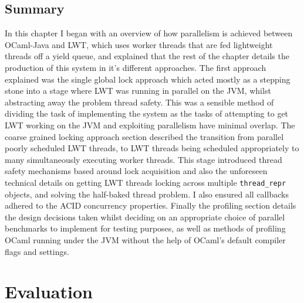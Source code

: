\documentclass[12pt,twoside,notitlepage]{report}
\begin{document}
\section{Summary}
\label{sec:implementation_summary}
In this chapter I began with an overview of how parallelism is achieved between OCaml-Java and LWT, which uses worker threads that are fed lightweight threads off a yield queue, and explained that the rest of the chapter details the
production of this system in it's different approaches. The first approach explained was the single global lock approach which acted mostly as a stepping stone into a stage where LWT was running in parallel on the JVM, whilst abstracting
away the problem thread safety. This was a sensible method of dividing the task of implementing the system as the tasks of attempting to get LWT working on the JVM and exploiting parallelism have minimal overlap. The coarse grained
locking approach section described the transition from parallel poorly scheduled LWT threads, to LWT threads being scheduled appropriately to many simultaneously executing worker threads. This stage introduced thread safety
mechanisms based around lock acquisition and also the unforeseen technical details on getting LWT threads locking across multiple {\tt thread\_repr} objects, and solving the half-baked thread problem. I also ensured all callbacks adhered to the ACID
concurrency properties. Finally the profiling section details the design decisions taken whilst deciding on an appropriate choice of parallel benchmarks to implement for testing purposes, as well as methods of profiling OCaml running
under the JVM without the help of OCaml's default compiler flags and settings.

\chapter{Evaluation}
\label{chap:evaluation}
\end{document}
